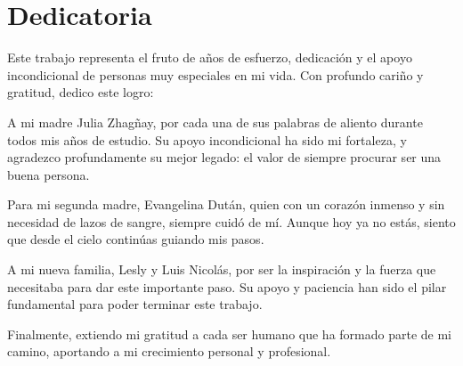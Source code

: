\chapter*{Dedicatoria}

Este trabajo representa el fruto de años de esfuerzo, dedicación y el apoyo incondicional de personas muy especiales en mi vida. Con profundo cariño y gratitud, dedico este logro:

A mi madre Julia Zhagñay, por cada una de sus palabras de aliento durante todos mis años de estudio. Su apoyo incondicional ha sido mi fortaleza, y agradezco profundamente su mejor legado: el valor de siempre procurar ser una buena persona.

Para mi segunda madre, Evangelina Dután, quien con un corazón inmenso y sin necesidad de lazos de sangre, siempre cuidó de mí. Aunque hoy ya no estás, siento que desde el cielo continúas guiando mis pasos.

A mi nueva familia, Lesly y Luis Nicolás, por ser la inspiración y la fuerza que necesitaba para dar este importante paso. Su apoyo y paciencia han sido el pilar fundamental para poder terminar este trabajo.

Finalmente, extiendo mi gratitud a cada ser humano que ha formado parte de mi camino, aportando a mi crecimiento personal y profesional.